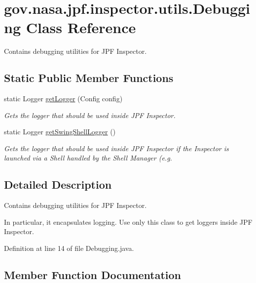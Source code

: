 \hypertarget{classgov_1_1nasa_1_1jpf_1_1inspector_1_1utils_1_1_debugging}{}\section{gov.\+nasa.\+jpf.\+inspector.\+utils.\+Debugging Class Reference}
\label{classgov_1_1nasa_1_1jpf_1_1inspector_1_1utils_1_1_debugging}


Contains debugging utilities for J\+PF Inspector.  


\subsection*{Static Public Member Functions}
\begin{DoxyCompactItemize}
\item 
static Logger \hyperlink{classgov_1_1nasa_1_1jpf_1_1inspector_1_1utils_1_1_debugging_a06cdc92a97816ad85793b034bfd5822a}{get\+Logger} (Config config)
\begin{DoxyCompactList}\small\item\em Gets the logger that should be used inside J\+PF Inspector. \end{DoxyCompactList}\item 
static Logger \hyperlink{classgov_1_1nasa_1_1jpf_1_1inspector_1_1utils_1_1_debugging_a23851f3e2354b6b84d3ddc05dac7965e}{get\+Swing\+Shell\+Logger} ()
\begin{DoxyCompactList}\small\item\em Gets the logger that should be used inside J\+PF Inspector if the Inspector is launched via a Shell handled by the Shell Manager (e.\+g. \end{DoxyCompactList}\end{DoxyCompactItemize}


\subsection{Detailed Description}
Contains debugging utilities for J\+PF Inspector. 

In particular, it encapsulates logging. Use only this class to get loggers inside J\+PF Inspector. 

Definition at line 14 of file Debugging.\+java.



\subsection{Member Function Documentation}
